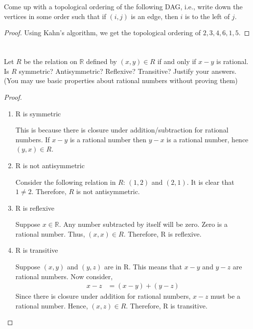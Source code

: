 \documentclass[11pt]{scrartcl}
\begin{document}
\section{}
Come up with a topological ordering of the following DAG, i.e., write
down the vertices in some order such that if $(i, j)$ is an edge, then $i$ is
to the left of $j$.
\begin{proof}
	Using Kahn's algorithm, we get the topological ordering of
	$2,3,4,6,1,5$.
\end{proof}

\section{}
Let $R$ be the relation on $\mathbb{R}$ defined by $(x, y) \in R$ if and only if $x - y$
is rational. Is $R$ symmetric? Antisymmetric? Reflexive? Transitive?
Justify your answers. (You may use basic properties about rational
numbers without proving them)
\begin{proof}\
	\begin{enumerate}[label=\alph*.]
		\item{
		      R is symmetric\par
		      This is because there is closure under addition/subtraction for rational numbers.
		      If $x - y$ is a rational number then $y - x$ is a rational number, hence
		      $(y,x) \in R$.
		      }
		\item{
		      R is not antisymmetric \par
		      Consider the following relation in $R$: $(1,2)$ and $(2,1)$.
		      It is clear that $1 \neq 2$. Therefore, $R$ is not antisymmetric.
		      }
		\item{
		      R is reflexive \par
		      Suppose $x \in \mathbb{R}$. Any number subtracted by itself will be zero.
		      Zero is a rational number. Thus, $(x,x) \in R$. Therefore, R is reflexive.
		      }
		\item{
		      R is transitive \par
		      Suppose $(x,y)$ and $(y,z)$ are in R. This means that $x - y$ and $y - z$ are rational
		      numbers. Now consider,
		      \begin{align*}
			      x - z & = (x - y) + (y - z)
		      \end{align*}
		      Since there is closure under addition for rational numbers, $x - z$ must be a rational number.
		      Hence, $(x,z) \in R$. Therefore, R is transitive.
		      }
	\end{enumerate}
\end{proof}
\end{document}
